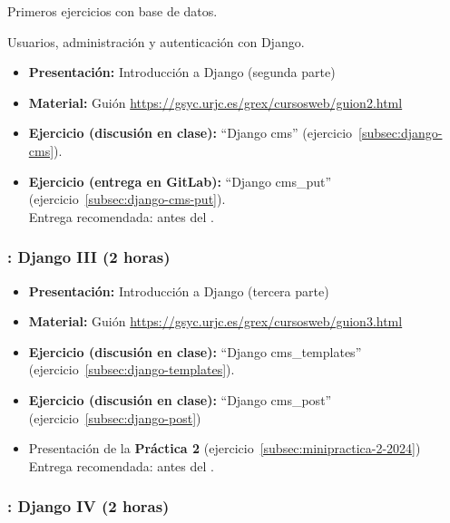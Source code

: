 \documentclass[a4paper,12pt]{article}
\begin{document}
Primeros ejercicios con base de datos.

Usuarios, administración y autenticación con Django.

\begin{itemize}
 \item \textbf{Presentación:} Introducción a Django (segunda parte)
  \item \textbf{Material:} Guión \url{https://gsyc.urjc.es/grex/cursosweb/guion2.html}
 \item \textbf{Ejercicio  (discusión en clase):} ``Django cms'' (ejercicio~\ref{subsec:django-cms}). \\
 \item \textbf{Ejercicio (entrega en GitLab):} ``Django cms\_put'' (ejercicio~\ref{subsec:django-cms-put}). \\
  Entrega recomendada: antes del \martesI.
\end{itemize}

\subsubsection{\martesI: Django III (2 horas)}
\label{cal:martesI}

\begin{itemize}
 \item \textbf{Presentación:} Introducción a Django (tercera parte)
  \item \textbf{Material:} Guión \url{https://gsyc.urjc.es/grex/cursosweb/guion3.html}
 \item \textbf{Ejercicio (discusión en clase):} ``Django cms\_templates'' (ejercicio~\ref{subsec:django-templates}).
 \item \textbf{Ejercicio (discusión en clase):} ``Django cms\_post'' (ejercicio~\ref{subsec:django-post}) \\
  \item Presentación de la \textbf{Práctica 2} (ejercicio~\ref{subsec:minipractica-2-2024}) \\
  Entrega recomendada: antes del \martesK.
\end{itemize}

\subsubsection{\martesJ: Django IV (2 horas)}
\label{cal:martesJ}
\end{document}
